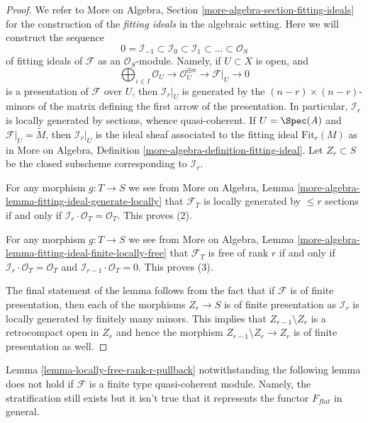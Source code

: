 \begin{proof}
We refer to More on Algebra, Section \ref{more-algebra-section-fitting-ideals}
for the construction of the {\it fitting ideals} in the algebraic
setting. Here we will construct the sequence
$$
0 = \mathcal{I}_{-1} \subset \mathcal{I}_0 \subset \mathcal{I}_1 \subset
\ldots \subset \mathcal{O}_S
$$
of fitting ideals of $\mathcal{F}$ as an $\mathcal{O}_S$-module.
Namely, if $U \subset X$ is open, and
$$
\bigoplus\nolimits_{i \in I} \mathcal{O}_U \to
\mathcal{O}_U^{\oplus n} \to \mathcal{F}|_U \to 0
$$
is a presentation of $\mathcal{F}$ over $U$, then
$\mathcal{I}_r|_U$ is generated by the $(n - r) \times (n - r)$-minors
of the matrix defining the first arrow of the presentation.
In particular, $\mathcal{I}_r$ is locally generated by sections, whence
quasi-coherent. If $U = \Spec(A)$ and $\mathcal{F}|_U = \widetilde{M}$, then
$\mathcal{I}_r|_U$ is the ideal sheaf associated to the fitting
ideal $\text{Fit}_r(M)$ as in
More on Algebra, Definition \ref{more-algebra-definition-fitting-ideal}.
Let $Z_r \subset S$ be the closed subscheme corresponding to $\mathcal{I}_r$.

\medskip\noindent
For any morphism $g : T \to S$ we see from
More on Algebra, Lemma \ref{more-algebra-lemma-fitting-ideal-generate-locally}
that $\mathcal{F}_T$ is locally generated by $\leq r$ sections if and only if
$\mathcal{I}_r \cdot \mathcal{O}_T = \mathcal{O}_T$.
This proves (2).

\medskip\noindent
For any morphism $g : T \to S$ we see from
More on Algebra, Lemma
\ref{more-algebra-lemma-fitting-ideal-finite-locally-free}
that $\mathcal{F}_T$ is free of rank $r$ if and only if
$\mathcal{I}_r \cdot \mathcal{O}_T = \mathcal{O}_T$ and
$\mathcal{I}_{r - 1} \cdot \mathcal{O}_T = 0$.
This proves (3).

\medskip\noindent
The final statement of the lemma follows from the fact that if
$\mathcal{F}$ is of finite presentation, then each of the morphisms
$Z_r \to S$ is of finite presentation as $\mathcal{I}_r$ is locally
generated by finitely many minors. This implies that
$Z_{r - 1} \setminus Z_r$ is a retrocompact open in $Z_r$
and hence the morphism $Z_{r - 1} \setminus Z_r \to Z_r$
is of finite presentation as well.
\end{proof}

\noindent
Lemma \ref{lemma-locally-free-rank-r-pullback} notwithstanding
the following lemma does not hold if $\mathcal{F}$ is a finite type
quasi-coherent module. Namely, the stratification still exists but
it isn't true that it represents the functor $F_{flat}$ in general.

